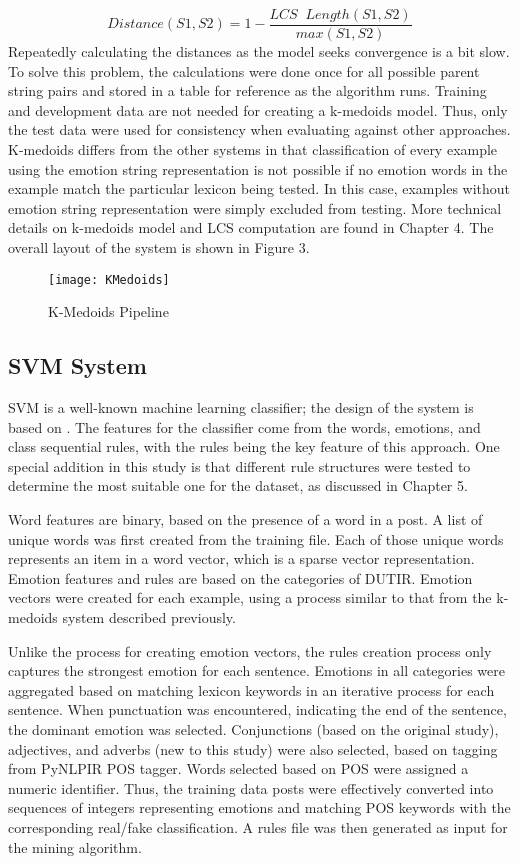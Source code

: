 \documentclass [11pt, proquest] {uwthesis}[2020/02/24]
\begin{document}
\begin{equation}
Distance(S1, S2) = 1 - \frac{LCS\;\;Length(S1,S2)}{max(S1,S2)}
\end{equation}
Repeatedly calculating the distances as the model seeks convergence is a bit slow. To solve this problem, the calculations were done once for all possible parent string pairs and stored in a table for reference as the algorithm runs. Training and development data are not needed for creating a k-medoids model. Thus, only the test data were used for consistency when evaluating against other approaches. K-medoids differs from the other systems in that classification of every example using the emotion string representation is not possible if no emotion words in the example match the particular lexicon being tested. In this case, examples without emotion string representation were simply excluded from testing. More technical details on k-medoids model and LCS computation are found in Chapter 4. The overall layout of the system is shown in Figure 3.
\begin{figure}[hbt!]
\texttt{[image: KMedoids]}
\caption{K-Medoids Pipeline}
\end{figure}
\subsection{SVM System}
SVM is a well-known machine learning classifier; the design of the system is based on \cite{Wen2014}.  The features for the classifier come from the words, emotions, and class sequential rules, with the rules being the key feature of this approach. One special addition in this study is that different rule structures were tested to determine the most suitable one for the dataset, as discussed in Chapter 5.

Word features are binary, based on the presence of a word in a post. A list of unique words was first created from the training file. Each of those unique words represents an item in a word vector, which is a sparse vector representation. Emotion features and rules are based on the categories of DUTIR. Emotion vectors were created for each example, using a process similar to that from the k-medoids system described previously. 

Unlike the process for creating emotion vectors, the rules creation process only captures the strongest emotion for each sentence. Emotions in all categories were aggregated based on matching lexicon keywords in an iterative process for each sentence. When punctuation was encountered, indicating the end of the sentence, the dominant emotion was selected.  Conjunctions (based on the original study), adjectives, and adverbs (new to this study) were also selected, based on tagging from PyNLPIR POS tagger. Words selected based on POS were assigned a numeric identifier. Thus, the training data posts were effectively converted into sequences of integers representing emotions and matching POS keywords with the corresponding real/fake classification.
A rules file was then generated as input for the mining algorithm.
\end{document}

